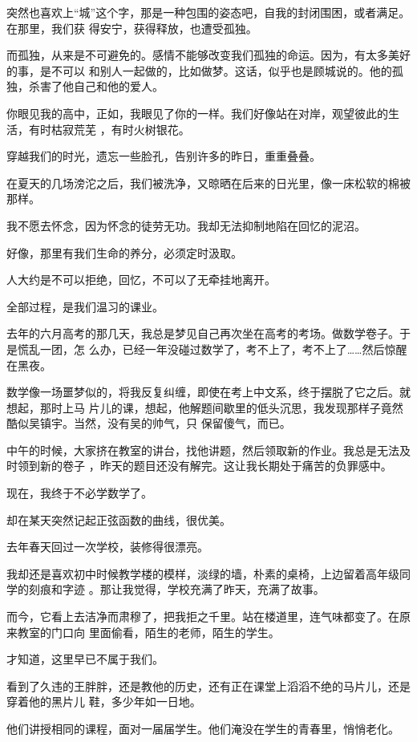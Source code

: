 \documentclass[12pt,a4paper]{article}
\begin{document}
		突然也喜欢上“城”这个字，那是一种包围的姿态吧，自我的封闭围困，或者满足。在那里，我们获
	得安宁，获得释放，也遭受孤独。


		而孤独，从来是不可避免的。感情不能够改变我们孤独的命运。因为，有太多美好的事，是不可以
	和别人一起做的，比如做梦。这话，似乎也是顾城说的。他的孤独，杀害了他自己和他的爱人。


		你眼见我的高中，正如，我眼见了你的一样。我们好像站在对岸，观望彼此的生活，有时枯寂荒芜
	，有时火树银花。

		穿越我们的时光，遗忘一些脸孔，告别许多的昨日，重重叠叠。

		在夏天的几场滂沱之后，我们被洗净，又晾晒在后来的日光里，像一床松软的棉被那样。

		我不愿去怀念，因为怀念的徒劳无功。我却无法抑制地陷在回忆的泥沼。

		好像，那里有我们生命的养分，必须定时汲取。

		人大约是不可以拒绝，回忆，不可以了无牵挂地离开。

		全部过程，是我们温习的课业。


		去年的六月高考的那几天，我总是梦见自己再次坐在高考的考场。做数学卷子。于是慌乱一团，怎
	么办，已经一年没碰过数学了，考不上了，考不上了……然后惊醒在黑夜。

		数学像一场噩梦似的，将我反复纠缠，即使在考上中文系，终于摆脱了它之后。就想起，那时上马
	片儿的课，想起，他解题间歇里的低头沉思，我发现那样子竟然酷似吴镇宇。当然，没有吴的帅气，只
	保留傻气，而已。

		中午的时候，大家挤在教室的讲台，找他讲题，然后领取新的作业。我总是无法及时领到新的卷子
	，昨天的题目还没有解完。这让我长期处于痛苦的负罪感中。

		现在，我终于不必学数学了。

		却在某天突然记起正弦函数的曲线，很优美。

		去年春天回过一次学校，装修得很漂亮。

		我却还是喜欢初中时候教学楼的模样，淡绿的墙，朴素的桌椅，上边留着高年级同学的刻痕和字迹
	。那让我觉得，学校充满了昨天，充满了故事。

		而今，它看上去洁净而肃穆了，把我拒之千里。站在楼道里，连气味都变了。在原来教室的门口向
	里面偷看，陌生的老师，陌生的学生。

		才知道，这里早已不属于我们。

		看到了久违的王胖胖，还是教他的历史，还有正在课堂上滔滔不绝的马片儿，还是穿着他的黑片儿
	鞋，多少年如一日地。

		他们讲授相同的课程，面对一届届学生。他们淹没在学生的青春里，悄悄老化。
\end{document}
